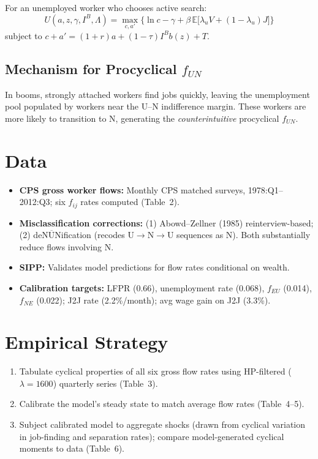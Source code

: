 For an unemployed worker who chooses active search:
\begin{equation}
  U(a,z,\gamma,I^B,\Lambda) = \max_{c,a'}\bigl\{\ln c - \gamma + \beta\,\mathbb{E}\bigl[\lambda_u V + (1-\lambda_u)J\bigr]\bigr\}
\end{equation}
subject to $c+a'=(1+r)a+(1-\tau)I^B b(z)+T$.

\subsection*{Mechanism for Procyclical $f_{UN}$}

In booms, strongly attached workers find jobs quickly, leaving the
unemployment pool populated by workers near the U--N indifference margin.
These workers are more likely to transition to N, generating the
\emph{counterintuitive} procyclical $f_{UN}$.

\section{Data}

\begin{itemize}
  \item \textbf{CPS gross worker flows:} Monthly CPS matched surveys,
    1978:Q1--2012:Q3; six $f_{ij}$ rates computed (Table~2).
  \item \textbf{Misclassification corrections:} (1) Abowd--Zellner (1985)
    reinterview-based; (2) de$\overline{\text{NUN}}$ification (recodes
    U$\to$N$\to$U sequences as N). Both substantially reduce flows involving N.
  \item \textbf{SIPP:} Validates model predictions for flow rates conditional
    on wealth.
  \item \textbf{Calibration targets:} LFPR (0.66), unemployment rate (0.068),
    $f_{EU}$ (0.014), $f_{NE}$ (0.022); J2J rate (2.2\%/month); avg wage
    gain on J2J (3.3\%).
\end{itemize}

\section{Empirical Strategy}

\begin{enumerate}
  \item Tabulate cyclical properties of all six gross flow rates using
    HP-filtered ($\lambda=1600$) quarterly series (Table~3).
  \item Calibrate the model's steady state to match average flow rates
    (Table~4--5).
  \item Subject calibrated model to aggregate shocks (drawn from cyclical
    variation in job-finding and separation rates); compare model-generated
    cyclical moments to data (Table~6).
\end{enumerate}

